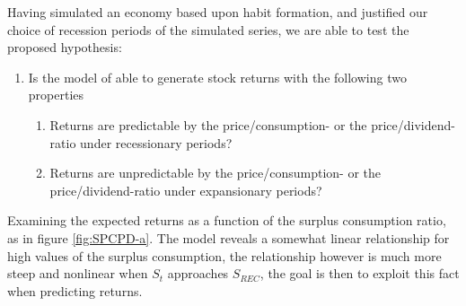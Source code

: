 Having simulated an economy based upon habit formation, and justified our choice of recession periods of the simulated series, we are able to test the proposed hypothesis:
\begin{enumerate}
    \item Is the model of \citet{Campbell1999} able to generate stock returns with the following two properties
    \begin{enumerate}
        \item Returns are predictable by the price/consumption- or the price/dividend-ratio under recessionary periods?
        \item Returns are unpredictable by the price/consumption- or the price/dividend-ratio under expansionary periods?
    \end{enumerate}
\end{enumerate}
Examining the expected returns as a function of the surplus consumption ratio, as in figure \ref{fig:SPCPD-a}. The model reveals a somewhat linear relationship for high values of the surplus consumption, the relationship however is much more steep and nonlinear when $S_t$ approaches ${S}_{REC}$, the goal is then to exploit this fact when predicting returns.

